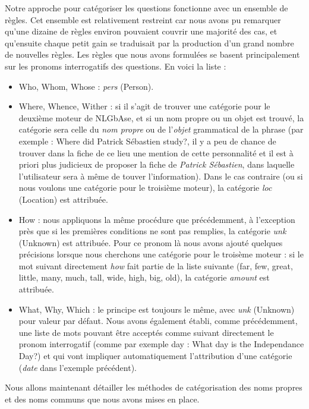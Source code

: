 \documentclass[10pt,a4paper]{article}
\begin{document}
\par Notre approche pour catégoriser les questions fonctionne avec un ensemble de règles. Cet ensemble est relativement restreint car nous avons pu remarquer qu'une dizaine de règles environ pouvaient couvrir une majorité des cas, et qu'ensuite chaque petit gain se traduisait par la production d'un grand nombre de nouvelles règles. Les règles que nous avons formulées se basent principalement sur les pronoms interrogatifs des questions. En voici la liste : 
\begin{itemize}
\item Who, Whom, Whose : \emph{pers} (Person).
\item Where, Whence, Wither : si il s'agit de trouver une catégorie pour le deuxième moteur de NLGbAse, et si un nom propre ou un objet est trouvé, la catégorie sera celle du \emph{nom propre} ou de l'\emph{objet} grammatical de la phrase (par exemple : \og{}Where did Patrick Sébastien study?\fg{}, il y a peu de chance de trouver dans la fiche de ce lieu une mention de cette personnalité et il est à priori plus judicieux de proposer la fiche de \emph{Patrick Sébastien}, dans laquelle l'utilisateur sera à même de touver l'information). Dans le cas contraire (ou si nous voulons une catégorie pour le troisième moteur), la catégorie \emph{loc} (Location) est attribuée.
\item How : nous appliquons la même procédure que précédemment, à l'exception près que si les premières conditions ne sont pas remplies, la catégorie \emph{unk} (Unknown) est attribuée. Pour ce pronom là nous avons ajouté quelques précisions lorsque nous cherchons une catégorie pour le troisème moteur : si le mot suivant directement \emph{how} fait partie de la liste suivante (far, few, great, little, many, much, tall, wide, high, big, old), la catégorie \emph{amount} est attribuée.
\item What, Why, Which : le principe est toujours le même, avec \emph{unk} (Unknown) pour valeur par défaut. Nous avons également établi, comme précédemment, une liste de mots pouvant être acceptés comme suivant directement le pronom interrogatif (comme par exemple day : \og{}What day is the Independance Day?\fg{}) et qui vont impliquer automatiquement l'attribution d'une catégorie (\emph{date} dans l'exemple précédent).
\end{itemize}
Nous allons maintenant détailler les méthodes de catégorisation des noms propres et des noms communs que nous avons mises en place.


\end{document}
